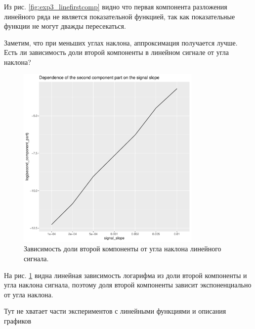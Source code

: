 \documentclass[specialist, substylefile = spbureport.rtx,
    subf,href,colorlinks=true, 12pt]{disser}
\newcommand{\F}{\mathsf{F}}
\newcommand{\sfS}{\mathsf{S}}
\newcommand{\sfR}{\mathsf{R}}
\begin{document}
        Из рис. \ref{fig:exp3_linefirstcomp} видно что первая компонента разложения линейного ряда не является показательной функцией, так как показательные функции не могут дважды пересекаться.

        Заметим, что при меньших углах наклона, аппроксимация получается лучше. Есть ли зависимость доли второй компоненты в линейном сигнале от угла наклона?

        \begin{figure}[h]
            \centering
            \includegraphics[width=0.8\textwidth]{experiment_3_secondpart.pdf}
            \caption{Зависимость доли второй компоненты от угла наклона линейного сигнала.}
            \label{fig:exp3_secondpart}
        \end{figure}

        На рис. \ref{fig:exp3_secondpart} видна линейная зависимость логарифма из доли второй компоненты и угла наклона сигнала, поэтому доля второй компоненты зависит экспоненциально от угла наклона.

        

        Тут не хватает части экспериментов с линейными функциями и описания графиков
        

        



\end{document}
